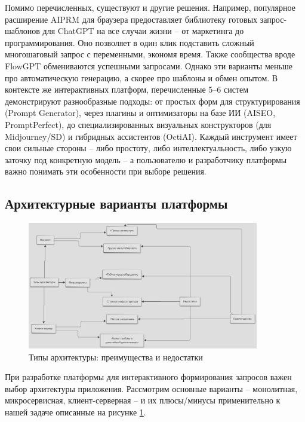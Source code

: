Помимо перечисленных, существуют и другие решения. Например, популярное расширение AIPRM для браузера предоставляет библиотеку готовых запрос-шаблонов для ChatGPT на все случаи жизни – от маркетинга до программирования. Оно позволяет в один клик подставить сложный многошаговый запрос с переменными, экономя время. Также сообщества вроде FlowGPT обмениваются успешными запросами. Однако эти варианты меньше про автоматическую генерацию, а скорее про шаблоны и обмен опытом. В контексте же интерактивных платформ, перечисленные 5–6 систем демонстрируют разнообразные подходы: от простых форм для структурирования (Prompt Generator), через плагины и оптимизаторы на базе ИИ (AISEO, PromptPerfect), до специализированных визуальных конструкторов (для Midjourney/SD) и гибридных ассистентов (OctiAI). Каждый инструмент имеет свои сильные стороны – либо простоту, либо интеллектуальность, либо узкую заточку под конкретную модель – а пользователю и разработчику платформы важно понимать эти особенности при выборе решения.
\subsection{Архитектурные варианты платформы}
\begin{figure}[htbp]
    \centering
    \includegraphics[width=0.9\textwidth]{picture/diploma_architecture_prototypes.png}
    \caption{Типы архитектуры: преимущества и недостатки}
    \label{architecture_prototypes}
\end{figure}
При разработке платформы для интерактивного формирования запросов важен выбор архитектуры приложения. Рассмотрим основные варианты – монолитная, микросервисная, клиент-серверная – и их плюсы/минусы применительно к нашей задаче описанные на рисунке \ref{architecture_prototypes}.

